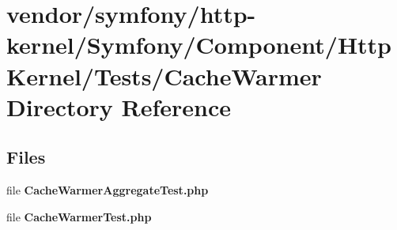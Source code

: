 \section{vendor/symfony/http-\/kernel/\+Symfony/\+Component/\+Http\+Kernel/\+Tests/\+Cache\+Warmer Directory Reference}
\label{dir_d960378e0cae58375f0b9fd636bf0674}
\subsection*{Files}
\begin{DoxyCompactItemize}
\item 
file {\bf Cache\+Warmer\+Aggregate\+Test.\+php}
\item 
file {\bf Cache\+Warmer\+Test.\+php}
\end{DoxyCompactItemize}
